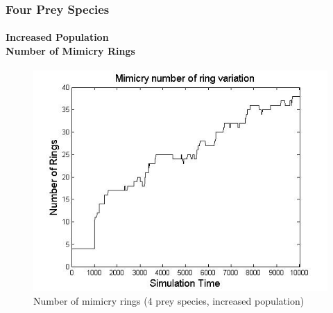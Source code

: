 \frame
{
	\frametitle{Four Prey Species}
	\framesubtitle{Increased Population\\ Number of Mimicry Rings}
	
	\begin{figure}[H]
		\centering
		\includegraphics[scale=0.30]{../tex/images/ringSize10k-4MorePrey}
		\caption{Number of mimicry rings (4 prey species, increased population)}
	\end{figure}	
}

